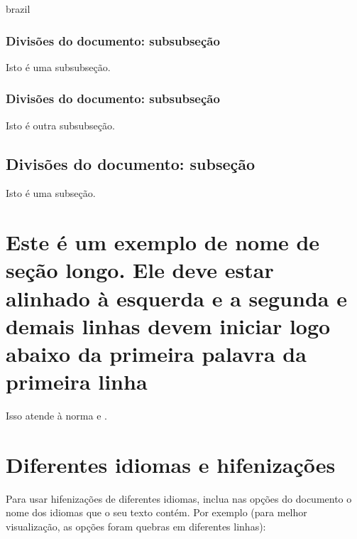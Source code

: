 \begin{otherlanguage*}{brazil}
\subsubsection{Divisões do documento: subsubseção}
\label{sec-divisoes-subsubsection}

Isto é uma subsubseção.

\subsubsection{Divisões do documento: subsubseção}

Isto é outra subsubseção.

\subsection{Divisões do documento: subseção}\label{sec-exemplo-subsec}

Isto é uma subseção.




\section[Exemplo muito longo]{Este é um exemplo de nome de seção longo. Ele deve estar
alinhado à esquerda e a segunda e demais linhas devem iniciar logo abaixo da
primeira palavra da primeira linha}

Isso atende à norma \textcite[seções de 5.2.2 a 5.2.4]{NBR14724:2011}
 e \textcite[seções de 3.1 a 3.8]{NBR6024:2012}.

\section{Diferentes idiomas e hifenizações}
\label{sec-hifenizacao}

Para usar hifenizações de diferentes idiomas, inclua nas opções do documento o
nome dos idiomas que o seu texto contém. Por exemplo (para melhor
visualização, as opções foram quebras em diferentes linhas):



\end{otherlanguage*}
